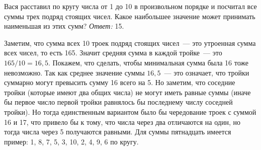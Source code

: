 \problem
Вася расставил по кругу числа от 1 до 10 в произвольном порядке и посчитал все
суммы трех подряд стоящих чисел.
Какое наибольшее значение может принимать наименьшая из этих сумм?
\solution
\emph{Ответ:} 15.
\par
Заметим, что сумма всех 10 троек подряд стоящих чисел~--- это утроенная сумма
всех чисел, то есть 165.
Значит средняя сумма в каждой тройке~--- это $165 / 10 = 16{,}5$.
Покажем, что сделать, чтобы минимальная сумма была 16 тоже невозможно.
Так как среднее значение суммы $16{,}5$~--- это означает, что тройки суммарно
могут превысить сумму 16 всего на 5.
Но заметим, что соседние тройки (которые имеют два общих числа) не могут иметь
равные суммы (иначе бы первое число первой тройки равнялось бы последнему
числу соседней тройки).
Но тогда единственным вариантом было бы чередование троек с суммой 16 и 17,
что привело бы к тому, что числа через два отличаются на один, но тогда числа
через 5 получаются равными.
Для суммы пятнадцать имеется пример: 1, 8, 7, 5, 3, 10, 2, 4, 9, 6 по кругу.
\endproblem
